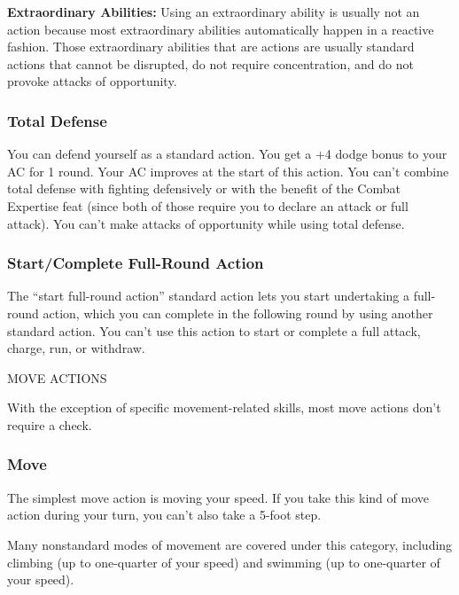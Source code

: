 \documentclass{article}
\begin{document}
\textbf{Extraordinary Abilities:} Using an extraordinary ability is usually not 
an action because most extraordinary abilities automatically happen in a reactive 
fashion. Those extraordinary abilities that are actions are usually standard actions 
that cannot be disrupted, do not require concentration, and do not provoke attacks 
of opportunity.

\vspace{12pt}
\subsubsection*{\textbf{Total Defense}}

You can defend yourself as a standard action. You get a +4 dodge bonus to your 
AC for 1 round. Your AC improves at the start of this action. You can't combine 
total defense with fighting defensively or with the benefit of the Combat Expertise 
feat (since both of those require you to declare an attack or full attack). You 
can't make attacks of opportunity while using total defense.

\vspace{12pt}
\subsubsection*{\textbf{Start/Complete Full-Round Action}}

The ``start full-round action'' standard action lets you start undertaking a full-round 
action, which you can complete in the following round by using another standard 
action. You can't use this action to start or complete a full attack, charge, run, 
or withdraw.

\vspace{12pt}
MOVE ACTIONS

With the exception of specific movement-related skills, most move actions don't 
require a check.

\vspace{12pt}
\subsubsection*{\textbf{Move}}

The simplest move action is moving your speed. If you take this kind of move action 
during your turn, you can't also take a 5-foot step.

Many nonstandard modes of movement are covered under this category, including climbing 
(up to one-quarter of your speed) and swimming (up to one-quarter of your speed).
\end{document}
